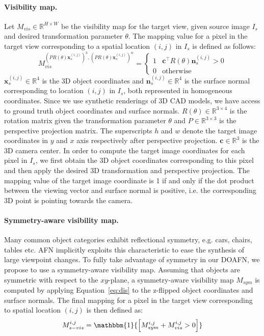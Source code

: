\documentclass[10pt,twocolumn,letterpaper]{article}
\begin{document}
\paragraph{Visibility map.}
Let $M_{vis} \in \mathbb{R}^{H \times W}$ be the visibility map for the target view, given source image $I_s$ and desired transformation parameter $\theta$. The mapping value for a pixel in the target view corresponding to a spatial location $(i,j)$ in $I_s$ is defined as follows: 
\begin{equation}
M_{vis}^{(PR(\theta)\mathbf{x}_s^{(i,j)})^h,(PR(\theta)\mathbf{x}_s^{(i,j)})^w} = \begin{cases} 
1 & \mathbf{c}^\top R(\theta)\mathbf{n}_s^{(i,j)} > 0\\
0 & \text{otherwise}
\end{cases}
\label{eq:dis}
\end{equation}
$\mathbf{x}_s^{(i,j)} \in \mathbb{R}^{4}$ is the 3D object coordinates and $\mathbf{n}_s^{(i,j)} \in \mathbb{R}^{4}$ is the surface normal corresponding to location $(i,j)$ in $I_s$, both represented in homogeneous coordinates. Since we use synthetic renderings of 3D CAD models, we have access to ground truth object coordinates and surface normals. $R(\theta) \in \mathbb{R}^{3 \times 4}$ is the rotation matrix given the transformation parameter $\theta$ and $P \in \mathbb{R}^{3 \times 3}$ is the perspective projection matrix. The superscripts $h$ and $w$ denote the target image coordinates in $y$ and $x$ axis respectively after perspective projection. $\mathbf{c} \in \mathbb{R}^{3}$ is the 3D camera center. In order to compute the target image coordinates for each pixel in $I_s$, we first obtain the 3D object coordinates corresponding to this pixel and then apply the desired 3D transformation and perspective projection. The mapping value of the target image coordinate is 1 if and only if the dot product between the viewing vector and surface normal is positive, i.e. the corresponding 3D point is pointing towards the camera.

\vspace{-2mm}
\paragraph{Symmetry-aware visibility map.}
Many common object categories exhibit reflectional symmetry, e.g. cars, chairs, tables etc. 
AFN implicitly exploits this characteristic to ease the synthesis of large viewpoint changes. To fully take advantage of symmetry in our DOAFN, we propose to use a symmetry-aware visibility map.
Assuming that objects are symmetric with respect to the $xy$-plane, a symmetry-aware visibility map $M_{sym}$ is computed by applying Equation~\ref{eq:dis} to the z-flipped object coordinates and surface normals. The final mapping for a pixel in the target view corresponding to spatial location $(i,j)$ is then defined as:
\begin{equation}
M_{s-vis}^{i,j} = \mathbbm{1}{\left[ M_{sym}^{i,j} + M_{vis}^{i,j} > 0 \right]}
\end{equation}
\end{document}
